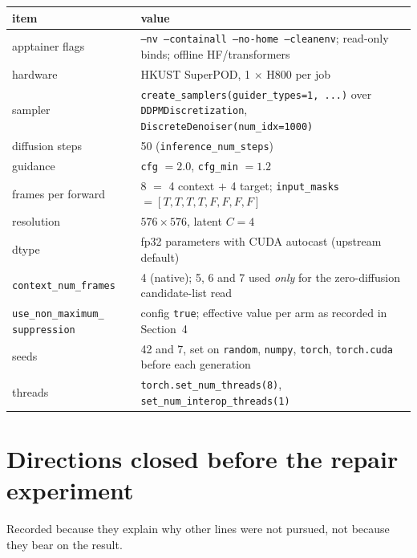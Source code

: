 \documentclass[11pt,a4paper]{article}
\newcommand{\code}[1]{\texttt{\small #1}}
\begin{document}
\begin{center}\small
\begin{tabular}{@{}L{4.9cm}L{9.6cm}@{}}
\toprule
item & value \\
\midrule
apptainer flags & \code{--nv --containall --no-home --cleanenv}; read-only binds; offline HF/transformers \\
hardware & HKUST SuperPOD, 1 $\times$ H800 per job \\
sampler & \code{create\_samplers(guider\_types=1, ...)} over \code{DDPMDiscretization}, \code{DiscreteDenoiser(num\_idx=1000)} \\
diffusion steps & 50 (\code{inference\_num\_steps}) \\
guidance & \code{cfg} $=2.0$, \code{cfg\_min} $=1.2$ \\
frames per forward & 8 $=$ 4 context $+$ 4 target; \code{input\_masks} $=[T,T,T,T,F,F,F,F]$ \\
resolution & $576\times576$, latent $C=4$ \\
dtype & fp32 parameters with CUDA autocast (upstream default) \\
\code{context\_num\_frames} & 4 (native); 5, 6 and 7 used \emph{only} for the zero-diffusion candidate-list read \\
\code{use\_non\_maximum\_} \code{suppression} & config \code{true}; effective value per arm as recorded in Section~4 \\
seeds & 42 and 7, set on \code{random}, \code{numpy}, \code{torch}, \code{torch.cuda} before each generation \\
threads & \code{torch.set\_num\_threads(8)}, \code{set\_num\_interop\_threads(1)} \\
\bottomrule
\end{tabular}
\end{center}

\section{Directions closed before the repair experiment}
\label{app:closed}

Recorded because they explain why other lines were not pursued, not because they bear on the result.
\end{document}
